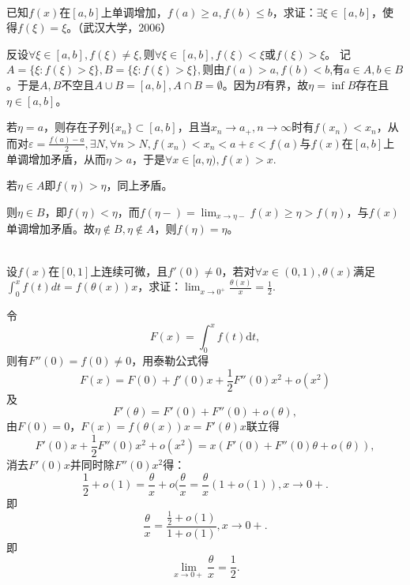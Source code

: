 \begin{example}
\hfill\\
  已知$f(x)$在$[a,b]$上单调增加，$f(a)\geq a,f(b)\leq b$，求证：$\exists\xi\in[a,b]$，使得$f(\xi)=\xi$。（武汉大学，2006）
  
  
  反设$\forall\xi\in[a,b],f(\xi)\neq\xi,$则$\forall\xi\in[a,b],f(\xi)<\xi$或$f(\xi)>\xi$。
  记$A=\{\xi:f(\xi)>\xi\},B=\{\xi:f(\xi)>\xi\},$则由$f(a)>a,f(b)<b$,有$a\in A,b\in B$。于是$A,B$不空且$A\cup B=[a,b],A\cap B=\emptyset$。因为$B$有界，故$\eta=\inf B$存在且$\eta\in[a,b]$。
  
  若$\eta=a$，则存在子列$\{x_n\}\subset[a,b]$，且当$x_n\rightarrow a_+,n\rightarrow\infty$时有$f(x_n)<x_n$，从而对$\varepsilon=\frac{f(a)-a}{2},\exists N,\forall n>N,f(x_n)<x_n<a+\varepsilon<f(a)$与$f(x)$在$[a,b]$上单调增加矛盾，从而$\eta>a$，于是$\forall x\in[a,\eta),f(x)>x.$
  
  若$\eta\in A$即$f(\eta)>\eta$，同上矛盾。
  
  则$\eta\in B$，即$f(\eta)<\eta$，而$f(\eta-)=\lim_{x\rightarrow\eta-}f(x)\geq\eta>f(\eta)$，与$f(x)$单调增加矛盾。故$\eta\not\in B,\eta\not\in A$，则$f(\eta)=\eta$。
  \end{example}
  \begin{example}
  \hfill\\
   设$f(x)$在$[0,1]$上连续可微，且$f'(0)\neq0$，若对$\forall x\in(0,1),\theta(x)$满足$\int_0^xf(t)dt=f(\theta(x))x$，求证：$\displaystyle \lim_{x\rightarrow 0^+}\frac{\theta(x)}x=\frac12$.
   
     令$$F(x)=\int_0^xf(t)\mathrm{d}t,$$
  则有$F''(0)=f(0)\neq0$，用泰勒公式得
  $$F(x)=F(0)+f'(0)x+\frac{1}{2}F''(0)x^2+o(x^2)$$
  及
  $$F'(\theta)=F'(0)+F''(0)+o(\theta),$$
  由$F(0)=0$，$F(x)=f(\theta(x))x=F'(\theta)x$联立得
  $$F'(0)x+\frac{1}{2}F''(0)x^2+o(x^2)=x(F'(0)+F''(0)\theta+o(\theta)),$$
  消去$F'(0)x$并同时除$F''(0)x^2$得：
  $$\frac{1}{2}+o(1)=\frac{\theta}{x}+o(\frac{\theta}{x}=\frac{\theta}{x}(1+o(1)),x\rightarrow0+.$$
  即
  $$\frac{\theta}{x}=\frac{\frac{1}{2}+o(1)}{1+o(1)},x\rightarrow0+.$$
  即
  $$\lim_{x\rightarrow0+}\frac{\theta}{x}=\frac{1}{2}.$$
  \end{example}
  
  
 \hfill\\
 
  
